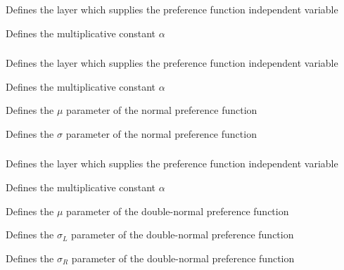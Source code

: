  {Defines the layer which supplies the preference function independent variable}

 {Defines the multiplicative constant $\alpha$}

\subsubsection[Normal]{}

 {Defines the layer which supplies the preference function independent variable}

 {Defines the multiplicative constant $\alpha$}

 {Defines the $\mu$ parameter of the normal preference function}

 {Defines the $\sigma$ parameter of the normal preference function}

\subsubsection[Double-normal]{}

 {Defines the layer which supplies the preference function independent variable}

 {Defines the multiplicative constant $\alpha$}

 {Defines the $\mu$ parameter of the double-normal preference function}

 {Defines the $\sigma_L$ parameter of the double-normal preference function}

 {Defines the $\sigma_R$ parameter of the double-normal preference function}

\subsubsection[Logistic]{}

